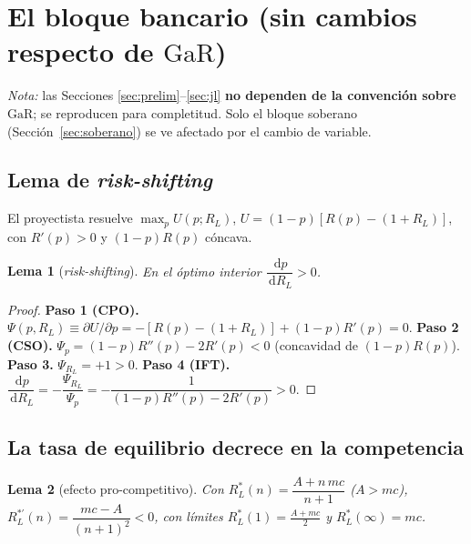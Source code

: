 \documentclass[11pt]{article}
\theoremstyle{plain}
\newtheorem{lemma}{Lema}
\theoremstyle{definition}
\newcommand{\GaR}{\mathrm{GaR}}
\newcommand{\1}{\mathbf{1}}
\newcommand{\dd}{\,\mathrm{d}}
\begin{document}
\section{El bloque bancario (sin cambios respecto de $\GaR$)}

\emph{Nota:} las Secciones \ref{sec:prelim}--\ref{sec:jl} \textbf{no dependen de la convención sobre $\GaR$}; se reproducen para completitud. Solo el bloque soberano (Sección~\ref{sec:soberano}) se ve afectado por el cambio de variable.

\subsection{Lema de \textit{risk-shifting}}\label{sec:rs}
El proyectista resuelve $\max_p U(p;R_L)$, $U=(1-p)[R(p)-(1+R_L)]$, con $R'(p)>0$ y $(1-p)R(p)$ cóncava.
\begin{lemma}[\textit{risk-shifting}]\label{lem:rs}
En el óptimo interior $\dfrac{\dd p}{\dd R_L}>0$.
\end{lemma}
\begin{proof}
\textbf{Paso 1 (CPO).} $\Psi(p,R_L)\equiv\partial U/\partial p=-[R(p)-(1+R_L)]+(1-p)R'(p)=0.$
\textbf{Paso 2 (CSO).} $\Psi_p=(1-p)R''(p)-2R'(p)<0$ (concavidad de $(1-p)R(p)$).
\textbf{Paso 3.} $\Psi_{R_L}=+1>0.$
\textbf{Paso 4 (IFT).} $\dfrac{\dd p}{\dd R_L}=-\dfrac{\Psi_{R_L}}{\Psi_p}=-\dfrac{1}{(1-p)R''(p)-2R'(p)}>0.$
\end{proof}

\subsection{La tasa de equilibrio decrece en la competencia}
\begin{lemma}[efecto pro-competitivo]\label{lem:RL}
Con $R_L^*(n)=\dfrac{A+n\,mc}{n+1}$ ($A>mc$), $R_L^{*\prime}(n)=\dfrac{mc-A}{(n+1)^2}<0$, con límites $R_L^*(1)=\frac{A+mc}{2}$ y $R_L^*(\infty)=mc$.
\end{lemma}
\end{document}
